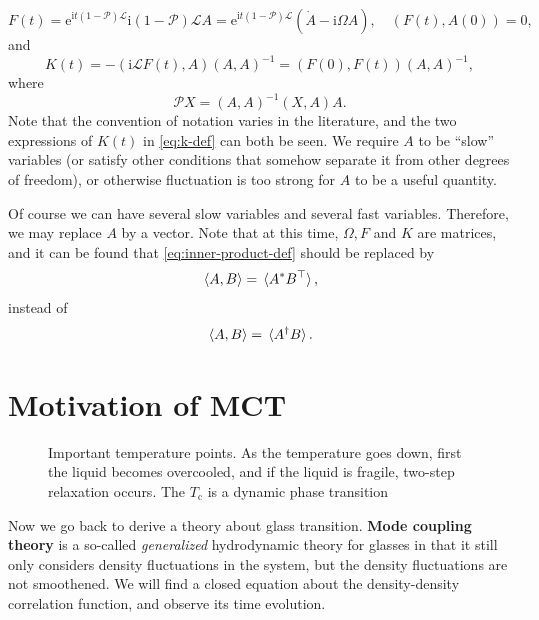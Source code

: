 \documentclass[hyperref, a4paper]{article}
\newcommand*{\ii}{\mathrm{i}}
\newcommand*{\ee}{\mathrm{e}}
\newcommand*{\concept}[1]{{\textbf{#1}}}
\begin{document}
\begin{equation}
    F(t)= \ee^{\ii t(1-\mathcal{P}) \mathcal{L}}\ii (1-\mathcal{P}) \mathcal{L} A
    = \ee^{\ii t(1-\mathcal{P}) \mathcal{L}} (\dot{A} - \ii \Omega A), \quad (F(t), A(0)) = 0,
\end{equation}
and 
\begin{equation}
    K(t)=- (\ii \mathcal{L} F(t),A)(A,A)^{-1} = (F(0), F(t)) (A,A)^{-1},
    \label{eq:k-def}
\end{equation}
where 
\begin{equation}
    \mathcal{P} X=(A,A)^{-1}(X,A)A.
\end{equation}
Note that the convention of notation varies in the literature, and the two expressions of $K(t)$ in \eqref{eq:k-def}
can both be seen. We require $A$ to be ``slow'' variables (or satisfy other conditions that somehow separate it 
from other degrees of freedom), or otherwise fluctuation is too strong for $A$ to be a useful quantity.

Of course we can have several slow variables and several fast variables. Therefore, we may replace $A$ by a vector. 
Note that at this time, $\Omega, F$ and $K$ are matrices, and it can be found that \eqref{eq:inner-product-def}
should be replaced by 
\begin{equation}
    \expval*{A, B} = \expval*{A^* B^\top},
\end{equation} 
instead of 
\[
    \expval*{A, B} = \expval*{A^\dagger B}.
\]

\section{Motivation of MCT}

\begin{figure}
    \centering
    
    \caption{Important temperature points. As the temperature goes down, first the liquid becomes overcooled,
    and if the liquid is fragile, two-step relaxation occurs. The $T_\text{c}$ is a dynamic phase transition }
\end{figure}

Now we go back to derive a theory about glass transition. \concept{Mode coupling theory} is a so-called 
\emph{generalized} hydrodynamic theory for glasses \cite{RevModPhys.76.785,Cummins_1999} in that it 
still only considers density fluctuations in the system, but the density fluctuations are not smoothened. 
We will find a closed equation about the density-density correlation function, and observe its time evolution.
\end{document}
